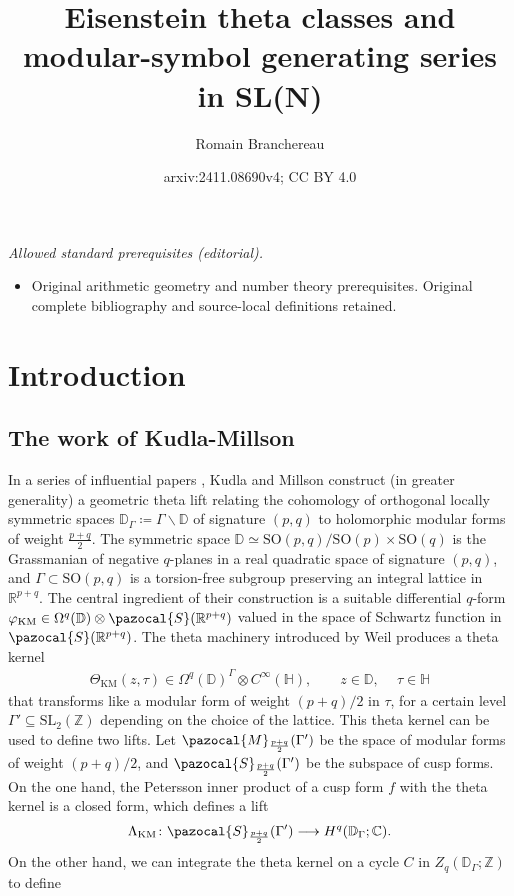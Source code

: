 \documentclass[a4paper,11pt]{amsart} %
\title{Eisenstein theta classes and modular-symbol generating series in SL(N)}
\author{Romain Branchereau}
\date{arxiv:2411.08690v4; CC BY 4.0}
\newcommand{\8}{\infty}
\newcommand{\Z}{\mathbb{Z}}
\newcommand{\SO}{\mathrm{SO}}
\newcommand{\SL}{\mathrm{SL}}
\newcommand{\KM}{\mathrm{KM}}
\newcommand{\D}{\mathbb{D}}
\newcommand{\HH}{\mathbb{H}}
\newcommand{\R}{\mathbb{R}}
\newcommand{\C}{\mathbb{C}}
\newcommand{\Scal}{\pazocal{S}}
\newcommand{\Mcal}{\pazocal{M}}
\theoremstyle{mytheoremstyle}
\theoremstyle{remark}
\numberwithin{equation}{section}
\begin{document}
\maketitle
\noindent\textit{Allowed standard prerequisites (editorial).}\begin{itemize}
\item Original arithmetic geometry and number theory prerequisites. Original complete bibliography and source-local definitions retained.
\end{itemize}\medskip
\section{Introduction}
\thispagestyle{empty}

\subsection{The work of Kudla-Millson} \label{intro: kudla millson} In a series of influential papers \cite{km2,km3,kmihes}, Kudla and Millson construct (in greater generality) a geometric theta lift relating the cohomology of orthogonal locally symmetric spaces $\D_\Gamma \coloneqq \Gamma \backslash \D$ of signature $(p,q)$ to holomorphic modular forms of weight $\frac{p+q}{2}$. The symmetric space $\D \simeq \SO(p,q)/\SO(p)\times \SO(q)$ is the Grassmanian of negative $q$-planes in a real quadratic space of signature $(p,q)$, and $\Gamma \subset \SO(p,q)$ is a torsion-free subgroup preserving an integral lattice in $\R^{p+q}$.
 The central ingredient of their construction is a suitable differential $q$-form $\varphi_{\KM} \in \Omega^q(\D) \otimes \Scal(\R^{p+q})$ valued in the space of Schwartz function in $\Scal(\R^{p+q})$. The theta machinery introduced by Weil \cite{weil} produces a theta kernel
\begin{align}
\Theta_{\KM}(z,\tau) \in \Omega^q(\D)^\Gamma \otimes C^\8(\HH), \qquad z \in \D, \ \quad \tau \in \HH
\end{align}
that transforms like a modular form of weight $(p+q)/2$ in $\tau$, for a certain level $\Gamma'\subseteq \SL_2(\Z)$ depending on the choice of the lattice. This theta kernel can be used to define two lifts. Let $\Mcal_{\frac{p+q}{2}}(\Gamma')$ be the space of modular forms of weight $(p+q)/2$, and $\Scal_{\frac{p+q}{2}}(\Gamma')$ be the subspace of cusp forms. On the one hand, the Petersson inner product of a cusp form $f$ with the theta kernel is a closed form, which defines a lift
\begin{align}
\Lambda_{\KM} \colon \Scal_{\frac{p+q}{2}}(\Gamma') \longrightarrow H^q(\D_\Gamma;\C).
\end{align} On the other hand, we can integrate the theta kernel on a cycle $C$ in $Z_q(\D_\Gamma;\Z)$ to define
\end{document}

